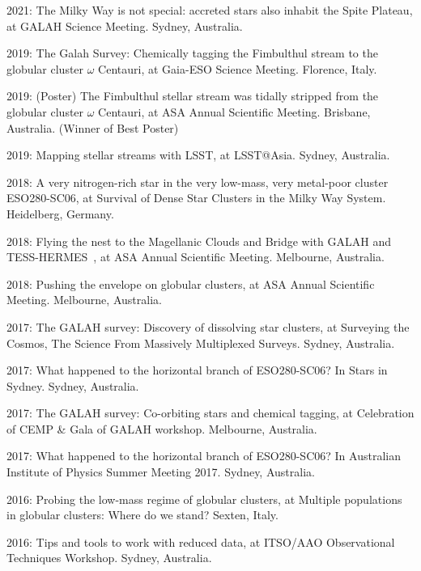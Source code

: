 \item[{\color{numcolor}\scriptsize17}] 2021: The Milky Way is not special: accreted stars also inhabit the Spite Plateau, at GALAH Science Meeting. Sydney, Australia.
\item[{\color{numcolor}\scriptsize17}] 2019: The Galah Survey: Chemically tagging the Fimbulthul stream to the globular cluster $\omega$ Centauri, at Gaia-ESO Science Meeting. Florence, Italy.
\item[{\color{numcolor}\scriptsize16}] 2019: (Poster) The Fimbulthul stellar stream was tidally stripped from the globular cluster $\omega$ Centauri, at ASA Annual Scientific Meeting. Brisbane, Australia. (Winner of Best Poster)
\item[{\color{numcolor}\scriptsize15}] 2019: Mapping stellar streams with LSST, at LSST@Asia. Sydney, Australia.
\item[{\color{numcolor}\scriptsize14}] 2018: A very nitrogen-rich star in the very low-mass, very metal-poor cluster ESO280-SC06, at Survival of Dense Star Clusters in the Milky Way System. Heidelberg, Germany.
\item[{\color{numcolor}\scriptsize13}] 2018: Flying the nest to the Magellanic Clouds and Bridge with GALAH and TESS-HERMES~, at ASA Annual Scientific Meeting. Melbourne, Australia.
\item[{\color{numcolor}\scriptsize12}] 2018: Pushing the envelope on globular clusters, at  ASA Annual Scientific Meeting. Melbourne, Australia.
\item[{\color{numcolor}\scriptsize11}] 2017: The GALAH survey: Discovery of dissolving star clusters, at  Surveying the Cosmos, The Science From Massively Multiplexed Surveys. Sydney, Australia.
\item[{\color{numcolor}\scriptsize10}] 2017: What happened to the horizontal branch of ESO280-SC06? In Stars in Sydney. Sydney, Australia.
\item[{\color{numcolor}\scriptsize9}] 2017: The GALAH survey: Co-orbiting stars and chemical tagging, at  Celebration of CEMP \& Gala of GALAH workshop. Melbourne, Australia.
\item[{\color{numcolor}\scriptsize8}] 2017: What happened to the horizontal branch of ESO280-SC06? In Australian Institute of Physics Summer Meeting 2017. Sydney, Australia.
\item[{\color{numcolor}\scriptsize7}] 2016: Probing the low-mass regime of globular clusters, at  Multiple populations in globular clusters: Where do we stand? Sexten, Italy.
\item[{\color{numcolor}\scriptsize6}] 2016: Tips and tools to work with reduced data, at  ITSO/AAO Observational Techniques Workshop. Sydney, Australia.

